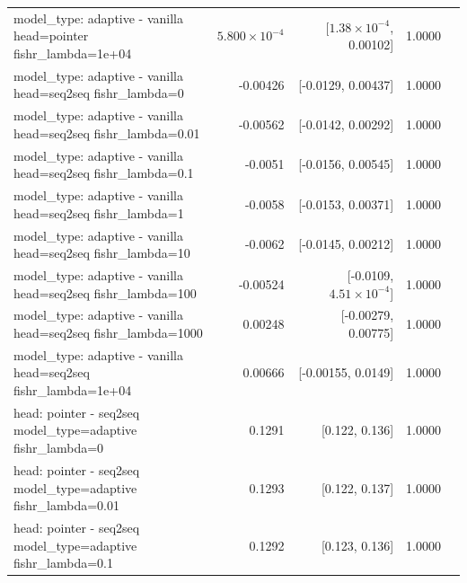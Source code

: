 \documentclass[10pt]{article}
\makeatletter
\newcommand{\stackcell}[1]{\begin{tabular}[t]{@{}l@{}}#1\end{tabular}}
\makeatother
\begin{document}
{\begin{longtable}{lrrrl}
\stackcell{model\_type: adaptive - vanilla\\\footnotesize head=pointer fishr\_lambda=1e+04 } & $5.800\times10^{-4}$ & [$1.38\times10^{-4}$, 0.00102] & 1.0000 & \\
\stackcell{model\_type: adaptive - vanilla\\\footnotesize head=seq2seq fishr\_lambda=0 } & -0.00426 & [-0.0129, 0.00437] & 1.0000 & \\
\stackcell{model\_type: adaptive - vanilla\\\footnotesize head=seq2seq fishr\_lambda=0.01 } & -0.00562 & [-0.0142, 0.00292] & 1.0000 & \\
\stackcell{model\_type: adaptive - vanilla\\\footnotesize head=seq2seq fishr\_lambda=0.1 } & -0.0051 & [-0.0156, 0.00545] & 1.0000 & \\
\stackcell{model\_type: adaptive - vanilla\\\footnotesize head=seq2seq fishr\_lambda=1 } & -0.0058 & [-0.0153, 0.00371] & 1.0000 & \\
\stackcell{model\_type: adaptive - vanilla\\\footnotesize head=seq2seq fishr\_lambda=10 } & -0.0062 & [-0.0145, 0.00212] & 1.0000 & \\
\stackcell{model\_type: adaptive - vanilla\\\footnotesize head=seq2seq fishr\_lambda=100 } & -0.00524 & [-0.0109, $4.51\times10^{-4}$] & 1.0000 & \\
\stackcell{model\_type: adaptive - vanilla\\\footnotesize head=seq2seq fishr\_lambda=1000 } & 0.00248 & [-0.00279, 0.00775] & 1.0000 & \\
\stackcell{model\_type: adaptive - vanilla\\\footnotesize head=seq2seq fishr\_lambda=1e+04 } & 0.00666 & [-0.00155, 0.0149] & 1.0000 & \\
\stackcell{head: pointer - seq2seq\\\footnotesize model\_type=adaptive fishr\_lambda=0 } & 0.1291 & [0.122, 0.136] & 1.0000 & \\
\stackcell{head: pointer - seq2seq\\\footnotesize model\_type=adaptive fishr\_lambda=0.01 } & 0.1293 & [0.122, 0.137] & 1.0000 & \\
\stackcell{head: pointer - seq2seq\\\footnotesize model\_type=adaptive fishr\_lambda=0.1 } & 0.1292 & [0.123, 0.136] & 1.0000 & \\

\end{longtable}}
\end{document}
